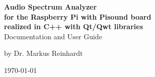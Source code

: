 \documentclass[11pt, oneside]{scrartcl}   	%
\begin{document}
	

\begingroup
\thispagestyle{empty}
\centering

\par\normalfont\fontsize{30}{30}\sffamily\selectfont
\vspace*{-0.5cm}
{\color{black}
	\textbf{\Huge Audio Spectrum Analyzer\\ for the Raspberry Pi with Pisound board \\
		    realized in C++ with Qt/Qwt libraries}\\
	\vspace*{1.5cm}
	{\textbf\huge Documentation and User Guide}\par %
	\vspace*{0.5cm}
	{\textbf \huge by Dr. Markus Reinhardt}\par %
	\vspace*{1.5cm}
	{\textbf \huge \today}\par
}
\endgroup
\vfill


\newpage
\thispagestyle{empty}
\tableofcontents

\thispagestyle{empty}
\listoffigures

\newpage
\pagestyle{scrheadings}
\end{document}

